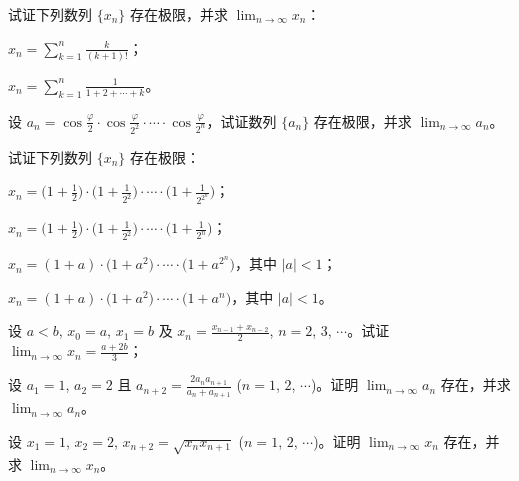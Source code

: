 	\begin{ti}
		试证下列数列 $\{x_n\}$ 存在极限，并求 $\lim_{n \to \infty} x_n$：
		\begin{xiaoti}
			\item $x_n = \sum_{k=1}^n \frac{k}{(k+1)!}$；
			\item $x_n = \sum_{k=1}^n \frac{1}{1+2+\cdots+k}$。
		\end{xiaoti}
	\end{ti}

	\begin{ti}
		设 $a_n = \cos \frac{\varphi}{2} \cdot \cos \frac{\varphi}{2^2} \cdot \cdots \cdot \cos \frac{\varphi}{2^n}$，试证数列 $\{a_n\}$ 存在极限，并求 $\lim_{n \to \infty} a_n$。
	\end{ti}

	\begin{ti}
		试证下列数列 $\{x_n\}$ 存在极限：
		\begin{xiaoti}
			\item $x_n = \bigl( 1 + \frac{1}{2} \bigr) \cdot \bigl( 1 + \frac{1}{2^2} \bigr) \cdot \cdots \cdot \bigl( 1 + \frac{1}{2^{2^n}} \bigr)$；
			\item $x_n = \bigl( 1 + \frac{1}{2} \bigr) \cdot \bigl( 1 + \frac{1}{2^2} \bigr) \cdot \cdots \cdot \bigl( 1 + \frac{1}{2^n} \bigr)$；
			\item $x_n = (1+a) \cdot \bigl( 1+a^2 \bigr) \cdot \cdots \cdot \bigl( 1 + a^{2^n} \bigr)$，其中 $|a| < 1$；
			\item $x_n = (1+a) \cdot \bigl( 1+a^2 \bigr) \cdot \cdots \cdot \bigl( 1 + a^n \bigr)$，其中 $|a| < 1$。
		\end{xiaoti}
	\end{ti}

	\begin{ti}
		\begin{xiaoti}
			\item 设 $a<b$, $x_0 = a$, $x_1 = b$ 及 $x_n = \frac{x_{n-1} + x_{n-2}}{2}$, $n=2$, $3$, $\cdots$。试证 $\lim_{n \to \infty} x_n = \frac{a+2b}{3}$；
			\item 设 $a_1 = 1$, $a_2 = 2$ 且 $a_{n+2} = \frac{2a_n a_{n+1}}{a_n + a_{n+1}}$ ($n=1$, $2$, $\cdots$)。证明 $\lim_{n \to \infty} a_n$ 存在，并求 $\lim_{n \to \infty} a_n$。
		\end{xiaoti}
	\end{ti}

	\begin{ti}
		设 $x_1 = 1$, $x_2 = 2$, $x_{n+2} = \sqrt{x_n x_{n+1}}$ ($n=1$, $2$, $\cdots$)。证明 $\lim_{n \to \infty} x_n$ 存在，并求 $\lim_{n \to \infty} x_n$。
	\end{ti}


